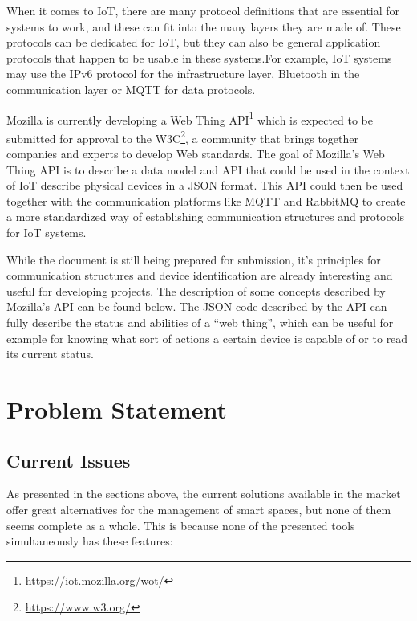 \documentclass[runningheads]{llncs}
\begin{document}
When it comes to IoT, there are many protocol definitions that are essential for systems to work, and these can fit into the many layers they are made of. These protocols can be dedicated for IoT, but they can also be general application protocols that happen to be usable in these systems.For example, IoT systems may use the IPv6 protocol for the infrastructure layer, Bluetooth in the communication layer or MQTT for data protocols.

Mozilla is currently developing a Web Thing API\footnote{\url{https://iot.mozilla.org/wot/}} which is expected to be submitted for approval to the W3C\footnote{\url{https://www.w3.org/}}, a community that brings together companies and experts to develop Web standards. The goal of Mozilla’s Web Thing API is to describe a data model and API that could be used in the context of IoT describe physical devices in a JSON format. This API could then be used together with the communication platforms like MQTT and RabbitMQ to create a more standardized way of establishing communication structures and protocols for IoT systems.

While the document is still being prepared for submission, it’s principles for communication structures and device identification are already interesting and useful for developing projects. The description of some concepts described by Mozilla’s API can be found below. The JSON code described by the API can fully describe the status and abilities of a “web thing”, which can be useful for example for knowing what sort of actions a certain device is capable of or to read its current status.

\section{Problem Statement}
\subsection{Current Issues}

As presented in the sections above, the current solutions available in the market offer great alternatives for the management of smart spaces, but none of them seems complete as a whole. This is because none of the presented tools simultaneously has these features:
\end{document}
